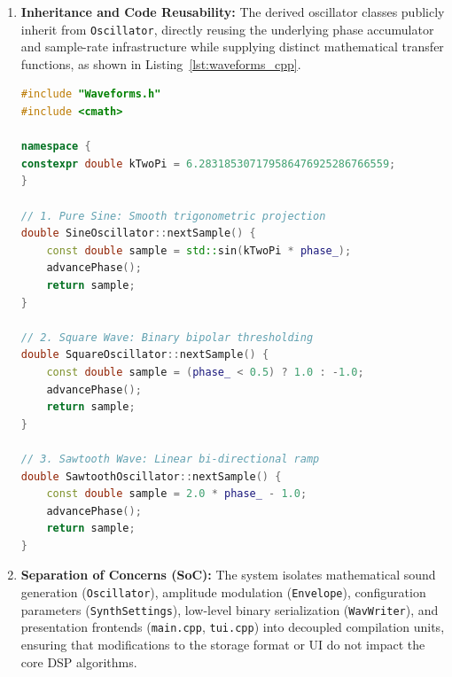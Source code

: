 \documentclass[12pt,a4paper,oneside]{book}
\begin{document}
\begin{enumerate}
\begin{lstlisting}[language=C++, caption={Encapsulated ADSR Dynamic Envelope Modulator (\texttt{src/Envelope.cpp})}, label={lst:envelope_cpp}]
    double gain;
    if (attack_ > 0.0 && t < attack_) {
        gain = t / attack_; // 1. Attack: Linear ramp up [0.0 -> 1.0]
    } else if (decay_ > 0.0 && t < attack_ + decay_) {
        // 2. Decay: Linear ramp down [1.0 -> sustain]
        gain = 1.0 - (1.0 - sustain_) * ((t - attack_) / decay_);
    } else {
        gain = sustain_;    // 3. Sustain: Steady-state plateau
    }

    // 4. Release: Smooth fade-out to zero at note termination
    if (release_ > 0.0) {
        gain *= std::clamp((length - t) / release_, 0.0, 1.0);
    }
    return gain;
}
\end{lstlisting}

    \item \textbf{Inheritance and Code Reusability:} 
    The derived oscillator classes publicly inherit from \texttt{Oscillator}, directly reusing the underlying phase accumulator and sample-rate infrastructure while supplying distinct mathematical transfer functions, as shown in Listing~\ref{lst:waveforms_cpp}.

\begin{lstlisting}[language=C++, caption={Concrete Derived Waveform Implementations (\texttt{src/Waveforms.cpp})}, label={lst:waveforms_cpp}]
#include "Waveforms.h"
#include <cmath>

namespace {
constexpr double kTwoPi = 6.283185307179586476925286766559;
}

// 1. Pure Sine: Smooth trigonometric projection
double SineOscillator::nextSample() {
    const double sample = std::sin(kTwoPi * phase_);
    advancePhase();
    return sample;
}

// 2. Square Wave: Binary bipolar thresholding
double SquareOscillator::nextSample() {
    const double sample = (phase_ < 0.5) ? 1.0 : -1.0;
    advancePhase();
    return sample;
}

// 3. Sawtooth Wave: Linear bi-directional ramp
double SawtoothOscillator::nextSample() {
    const double sample = 2.0 * phase_ - 1.0;
    advancePhase();
    return sample;
}
\end{lstlisting}

    \item \textbf{Separation of Concerns (SoC):} 
    The system isolates mathematical sound generation (\texttt{Oscillator}), amplitude modulation (\texttt{Envelope}), configuration parameters (\texttt{SynthSettings}), low-level binary serialization (\texttt{WavWriter}), and presentation frontends (\texttt{main.cpp}, \texttt{tui.cpp}) into decoupled compilation units, ensuring that modifications to the storage format or UI do not impact the core DSP algorithms.
\end{enumerate}
\end{document}

